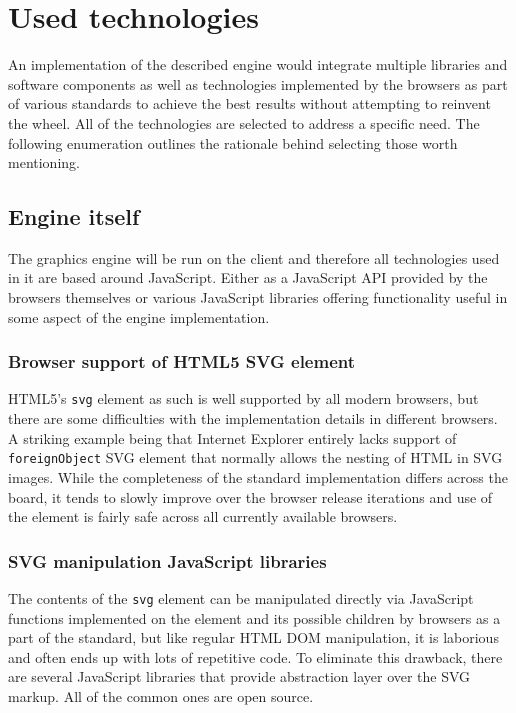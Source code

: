 \documentclass[11pt,oneside, final]{fithesis2}
\begin{document}
\chapter{Used technologies}
\label{tech}
An implementation of the described engine would integrate multiple libraries and software components as well as technologies implemented by the browsers as part of various standards to achieve the best results without attempting to reinvent the wheel. All of the technologies are selected to address a specific need. The following enumeration outlines the rationale behind selecting those worth mentioning.

\section{Engine itself}
The graphics engine will be run on the client and therefore all technologies used in it are based around JavaScript. Either as a JavaScript API provided by the browsers themselves or various JavaScript libraries offering functionality useful in some aspect of the engine implementation.

\subsection{Browser support of HTML5 SVG element}
HTML5's \texttt{svg} element as such is well supported by all modern browsers\cite{html5svg}, but there are some difficulties with the implementation details in different browsers. A striking example being that Internet Explorer entirely lacks support of \texttt{foreignObject} SVG element that normally allows the nesting of HTML in SVG images\cite{ieforeignobject}. While the completeness of the standard implementation differs across the board, it tends to slowly improve over the browser release iterations and use of the element is fairly safe across all currently available browsers.

\subsection{SVG manipulation JavaScript libraries}
The contents of the \texttt{svg} element can be manipulated directly via JavaScript functions implemented on the element and its possible children by browsers as a part of the standard\cite{svgtypes}, but like regular HTML DOM manipulation, it is laborious and often ends up with lots of repetitive code. To eliminate this drawback, there are several JavaScript libraries that provide abstraction layer over the SVG markup. All of the common ones are open source.
\end{document}
